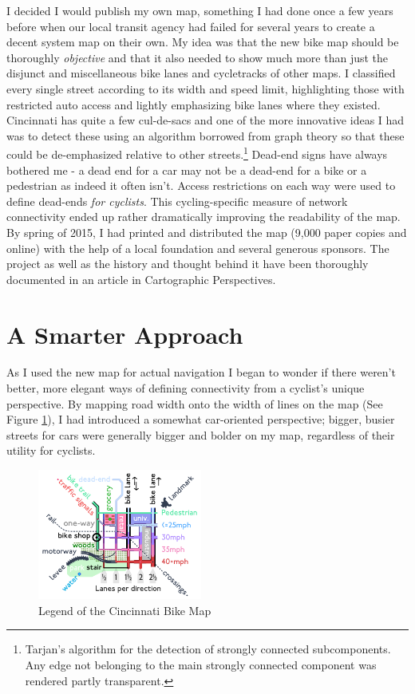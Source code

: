 \documentclass{article}
\begin{document}
		I decided I would publish my own map, something I had done once a few years before when our local transit agency had failed for several years to create a decent system map on their own.
		My idea was that the new bike map should be thoroughly \textit{objective} and that it also needed to show much more than just the disjunct and miscellaneous bike lanes and cycletracks of other maps. I classified every single street according to its width and speed limit, highlighting those with restricted auto access and lightly emphasizing bike lanes where they existed. Cincinnati has quite a few cul-de-sacs and one of the more innovative ideas I had was to detect these using an algorithm borrowed from graph theory so that these could be de-emphasized relative to other streets.\footnote{
			Tarjan's algorithm for the detection of strongly connected subcomponents. Any edge not belonging to the main strongly connected component was rendered partly transparent.
		} Dead-end signs have always bothered me - a dead end for a car may not be a dead-end for a bike or a pedestrian as indeed it often isn't. Access restrictions on each way were used to define dead-ends \textit{for cyclists}. 
		This cycling-specific measure of network connectivity ended up rather dramatically improving the readability of the map. 
		By spring of 2015, I had printed and distributed the map (9,000 paper copies and online) with the help of a local foundation and several generous sponsors. The project as well as the history and thought behind it have been thoroughly documented in an article in Cartographic Perspectives.\cite{Wessel2015}
	
	\section*{A Smarter Approach}
	
		As I used the new map for actual navigation I began to wonder if there weren't better, more elegant ways of defining connectivity from a cyclist's unique perspective. By mapping road width onto the width of lines on the map (See Figure \ref{fig:legend}), I had introduced a somewhat car-oriented perspective; bigger, busier streets for cars were generally bigger and bolder on my map, regardless of their utility for cyclists. 
		
		\begin{figure}[h!]
			\includegraphics[width=0.48\textwidth]{legend}
			\caption{Legend of the Cincinnati Bike Map}
			\label{fig:legend}
		\end{figure}
		
\end{document}
